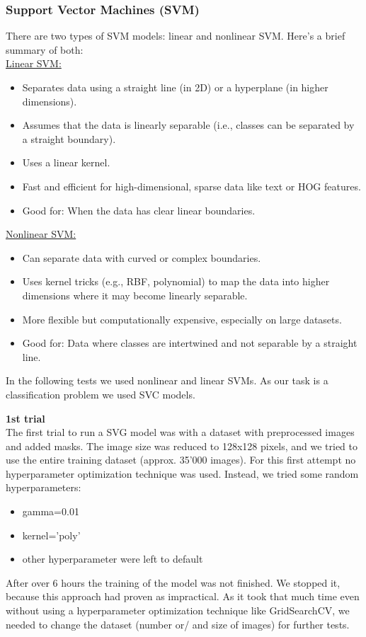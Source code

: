 \documentclass{article}
\begin{document}
\subsubsection{Support Vector Machines (SVM)}
There are two types of SVM models: linear and nonlinear SVM. Here's a brief summary of both: \\
\underline{Linear SVM:}
\begin{itemize}
    \item Separates data using a straight line (in 2D) or a hyperplane (in higher dimensions).
    \item Assumes that the data is linearly separable (i.e., classes can be separated by a straight boundary).
    \item Uses a linear kernel.
    \item Fast and efficient for high-dimensional, sparse data like text or HOG features.
    \item Good for: When the data has clear linear boundaries.
\end{itemize}
\underline{Nonlinear SVM:}
\begin{itemize}
    \item Can separate data with curved or complex boundaries.
    \item Uses kernel tricks (e.g., RBF, polynomial) to map the data into higher dimensions where it may become linearly separable.
    \item More flexible but computationally expensive, especially on large datasets.
    \item Good for: Data where classes are intertwined and not separable by a straight line.
\end{itemize}

In the following tests we used nonlinear and linear SVMs. As our task  is a classification problem we used SVC models.

\textbf{1st trial}\\
The first trial to run a SVG model was with a dataset with preprocessed images and added masks. The image size was reduced to 128x128 pixels, and we tried 
to use the entire training dataset (approx. 35'000 images). For this first attempt no hyperparameter optimization technique was used. Instead, we tried some random 
hyperparameters: 
\begin{itemize}
    \item gamma=0.01
    \item kernel='poly'
    \item other hyperparameter were left to default
\end{itemize}
After over 6 hours the training of the model was not finished. We stopped it, because this approach had proven as impractical. As it took that much time even without
using a hyperparameter optimization technique like GridSearchCV, we needed to change the dataset (number or/ and size of images) for further tests.
\end{document}
